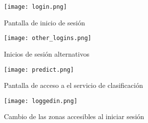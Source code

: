 \begin{figure}
	\centering
	\texttt{[image: login.png]}
	\caption{Pantalla de inicio de sesión}\label{fig:login.png}
\end{figure}

\begin{figure}
	\centering
	\texttt{[image: other\_logins.png]}
	\caption{Inicios de sesión alternativos}\label{fig:other_logins.png}
\end{figure}

\begin{figure}
	\centering
	\texttt{[image: predict.png]}
	\caption{Pantalla de acceso a el servicio de clasificación}\label{fig:predict.png}
\end{figure}


\begin{figure}
	\centering
	\texttt{[image: loggedin.png]}
	\caption{Cambio de las zonas accesibles al iniciar sesión}\label{fig:loggedin.png}
\end{figure}





